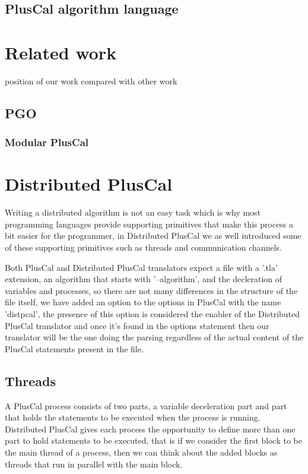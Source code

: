 \documentclass{thesul}
\begin{document}
\section{PlusCal algorithm language}
 

\chapter{Related work}
position of our work compared with other work

\section{PGO}

\subsection{Modular PlusCal}

\chapter{Distributed PlusCal}

Writing a distributed algorithm is not an easy task which is why most programming languages provide supporting primitives that make this process a bit easier for the programmer, in Distributed PlusCal we as well introduced some of these supporting primitives such as threads and communication channels.

Both PlusCal and Distributed PlusCal translators expect a file with a '.tla' extension, an algorithm that starts with '--algorithm', and the decleration of variables and processes, so there are not many differences in the structure of the file itself, we have added an option to the options in PlusCal with the name 'distpcal', the presence of this option is considered the enabler of the Distributed PlusCal translator and once it's found in the options statement then our translator will be the one doing the parsing regardless of the actual content of the PlusCal statements present in the file.

\section{Threads}

A PlusCal process consists of two parts, a variable deceleration part and part that holds the statements to be executed when the process is running.
Distributed PlusCal gives each process the opportunity to define more than one part to hold statements to be executed, that is if we consider the first   block to be the main thread of a process, then we can think about the added blocks as threads that run in parallel with the main block.
\end{document}
